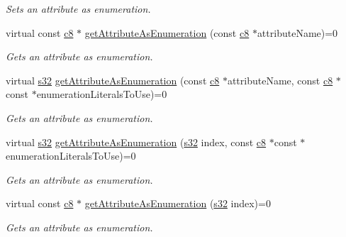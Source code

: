 \begin{DoxyCompactItemize}
\begin{DoxyCompactList}\small\item\em Sets an attribute as enumeration. \end{DoxyCompactList}\item 
virtual const \hyperlink{namespaceirr_a9395eaea339bcb546b319e9c96bf7410}{c8} $\ast$ \hyperlink{classirr_1_1io_1_1IAttributes_a2a204c332735a0b15fa555ae6e785214}{get\+Attribute\+As\+Enumeration} (const \hyperlink{namespaceirr_a9395eaea339bcb546b319e9c96bf7410}{c8} $\ast$attribute\+Name)=0
\begin{DoxyCompactList}\small\item\em Gets an attribute as enumeration. \end{DoxyCompactList}\item 
virtual \hyperlink{namespaceirr_ac66849b7a6ed16e30ebede579f9b47c6}{s32} \hyperlink{classirr_1_1io_1_1IAttributes_a77c6a5fba661a85701986382df7d13b3}{get\+Attribute\+As\+Enumeration} (const \hyperlink{namespaceirr_a9395eaea339bcb546b319e9c96bf7410}{c8} $\ast$attribute\+Name, const \hyperlink{namespaceirr_a9395eaea339bcb546b319e9c96bf7410}{c8} $\ast$const $\ast$enumeration\+Literals\+To\+Use)=0
\begin{DoxyCompactList}\small\item\em Gets an attribute as enumeration. \end{DoxyCompactList}\item 
virtual \hyperlink{namespaceirr_ac66849b7a6ed16e30ebede579f9b47c6}{s32} \hyperlink{classirr_1_1io_1_1IAttributes_a906b34ac742d3418d16afcf1d1e2aaa4}{get\+Attribute\+As\+Enumeration} (\hyperlink{namespaceirr_ac66849b7a6ed16e30ebede579f9b47c6}{s32} index, const \hyperlink{namespaceirr_a9395eaea339bcb546b319e9c96bf7410}{c8} $\ast$const $\ast$enumeration\+Literals\+To\+Use)=0
\begin{DoxyCompactList}\small\item\em Gets an attribute as enumeration. \end{DoxyCompactList}\item 
virtual const \hyperlink{namespaceirr_a9395eaea339bcb546b319e9c96bf7410}{c8} $\ast$ \hyperlink{classirr_1_1io_1_1IAttributes_a195cd7ee6a50a6a10d22a874072a93c9}{get\+Attribute\+As\+Enumeration} (\hyperlink{namespaceirr_ac66849b7a6ed16e30ebede579f9b47c6}{s32} index)=0
\begin{DoxyCompactList}\small\item\em Gets an attribute as enumeration. \end{DoxyCompactList}\item 

\end{DoxyCompactItemize}
